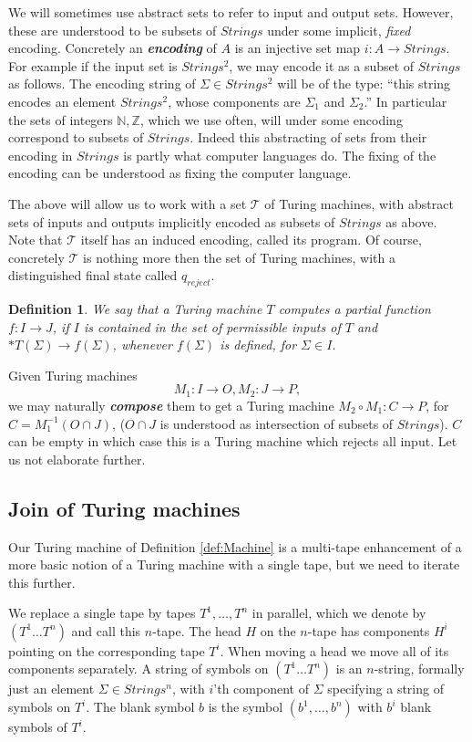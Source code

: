 \documentclass{amsart}  %
\numberwithin{equation}{section}
\newtheorem{definition}[equation]{Definition}
\theoremstyle{definition}
\theoremstyle{remark}
\begin{document}
{We will sometimes use abstract sets to refer to input and output sets.  However, these are understood to be subsets of $Strings$ under some implicit, \emph{fixed} encoding. Concretely an \textbf{\emph{encoding}}
of $A$ is an injective set map $i: A \to Strings$. For example if the input set is $Strings ^{2} $, we may encode it as a subset of $Strings$ as follows. The encoding string of $\Sigma \in Strings ^{2} $ will be of the type: ``this string encodes an element $ Strings ^{2} $, whose components are $\Sigma _{1}$ and $\Sigma _{2}  $.'' In particular the sets of integers $\mathbb{N}, \mathbb{Z}$, which we use often,  will under some encoding correspond to subsets of $Strings$.  Indeed this abstracting of sets from their encoding in $Strings$ is partly what computer languages do. The fixing of the encoding can be understood as fixing the computer language.  

 The above will allow us to work with a set $\mathcal{T}$ of Turing machines, with abstract sets of inputs and outputs implicitly encoded as subsets of $Strings$ as above. Note that $\mathcal{T}$ itself has an induced encoding, called its program. Of course, concretely $\mathcal{T}$ is nothing more then the set of Turing machines, with a distinguished final state called $q _{reject} $.  \begin{definition}  We say that a Turing machine $T$ computes a partial function $f: I \to J$, if $I$ is contained in the set of permissible inputs of $T$  and $*T (\Sigma) \to f (\Sigma)$,  whenever $f (\Sigma)$ is defined, for $\Sigma \in I$.
\end{definition} 

Given Turing machines $$M _{1}: {I} \to {O}, M _{2}: {J} \to {P},$$ we may naturally \textbf{\emph{compose}} them to get a Turing machine $M_2 \circ M _{1}: C \to P $, for $C=M _{1} ^{-1} ({O} \cap {J})$, ($O \cap J$ is understood as intersection of subsets of $Strings$). $C$ can be empty in which case this is a Turing machine which rejects all input. Let us not elaborate further.
\subsection {Join of Turing machines} Our Turing machine of Definition \ref{def:Machine} is a multi-tape enhancement of a more basic notion of a Turing machine with a single tape,
but we need to iterate this further.  

We replace a single tape by tapes $T ^{1}, \ldots, T ^{n}  $
in parallel, which we denote by $(T ^{1} \ldots T ^{n})$ and call this $n$-tape.
The head $H$ on the $n$-tape has components $H ^{i} $ pointing on the corresponding tape $T ^{i} $. When moving a head we move all of its components separately. A string of symbols on $(T ^{1} \ldots T ^{n})$ is an $n$-string, 
formally just an element $\Sigma \in Strings ^{n} $, with $i$'th component of $\Sigma$
specifying a string of symbols on $T ^{i} $. The blank symbol $b$ is the symbol $(b ^{1}, \ldots, b ^{n} )$  with  $b ^{i} $ blank symbols of $T ^{i} $.









}
\end{document}
